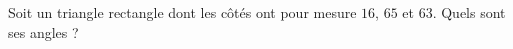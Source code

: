 
\begin{exercice}\label{exo2smath-0148}

    Soit un triangle rectangle dont les côtés ont pour mesure \( 16\), \( 65\) et \( 63\). Quels sont ses angles ?

\end{exercice}
